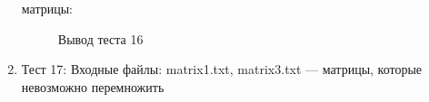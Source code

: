 \documentclass[12pt, a4paper]{article}
\begin{document}
\begin{enumerate}
	матрицы:
	\begin{figure}[h]
  		\caption{Вывод теста 16}
	\end{figure}
	\newpage
	\item Тест 17: Входные файлы: matrix1.txt, 
	matrix3.txt --- матрицы, которые невозможно перемножить\\

\end{enumerate}
\end{document}
